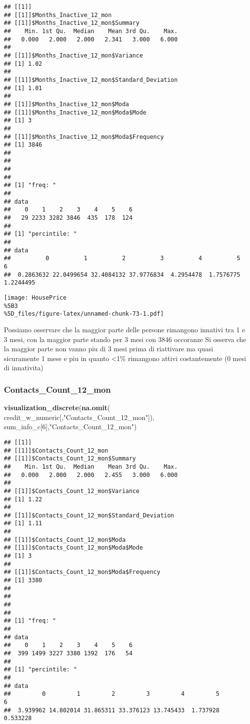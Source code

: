 \documentclass[
]{article}
\newenvironment{Shaded}{\begin{snugshade}}{\end{snugshade}}
\newcommand{\DecValTok}[1]{\textcolor[rgb]{0.00,0.00,0.81}{#1}}
\newcommand{\FunctionTok}[1]{\textcolor[rgb]{0.13,0.29,0.53}{\textbf{#1}}}
\newcommand{\NormalTok}[1]{#1}
\newcommand{\StringTok}[1]{\textcolor[rgb]{0.31,0.60,0.02}{#1}}
\begin{document}
\begin{verbatim}
## [[1]]
## [[1]]$Months_Inactive_12_mon
## [[1]]$Months_Inactive_12_mon$Summary
##    Min. 1st Qu.  Median    Mean 3rd Qu.    Max. 
##   0.000   2.000   2.000   2.341   3.000   6.000 
## 
## [[1]]$Months_Inactive_12_mon$Variance
## [1] 1.02
## 
## [[1]]$Months_Inactive_12_mon$Standard_Deviation
## [1] 1.01
## 
## [[1]]$Months_Inactive_12_mon$Moda
## [[1]]$Months_Inactive_12_mon$Moda$Mode
## [1] 3
## 
## [[1]]$Months_Inactive_12_mon$Moda$Frequency
## [1] 3846
## 
## 
## 
## 
## [1] "freq: "
## 
## data
##    0    1    2    3    4    5    6 
##   29 2233 3282 3846  435  178  124 
## 
## [1] "percintile: "
## 
## data
##          0          1          2          3          4          5          6 
##  0.2863632 22.0499654 32.4084132 37.9776834  4.2954478  1.7576775  1.2244495
\end{verbatim}

\texttt{[image: HousePrice\\\%5B3\\\%5D\_files/figure-latex/unnamed-chunk-73-1.pdf]}

Possiamo osservare che la maggior parte delle persone rimangono innativi
tra 1 e 3 mesi, con la maggior parte stando per 3 mesi con 3846
occoranze Si osserva che la maggior parte non vanno piu di 3 mesi prima
di riattivare ma quasi sicuramente 1 mese e piu in quanto \textless1\%
rimangono attivi costantemente (0 mesi di innativita)

\subsubsection{Contacts\_Count\_12\_mon}\label{contacts_count_12_mon}

\begin{Shaded}
\begin{Highlighting}[]
\FunctionTok{visualization\_discrete}\NormalTok{(}\FunctionTok{na.omit}\NormalTok{(}
\NormalTok{  credit\_w\_numeric[,}\StringTok{"Contacts\_Count\_12\_mon"}\NormalTok{]), sum\_info\_c[}\DecValTok{6}\NormalTok{],}\StringTok{"Contacts\_Count\_12\_mon"}\NormalTok{)}
\end{Highlighting}
\end{Shaded}

\begin{verbatim}
## [[1]]
## [[1]]$Contacts_Count_12_mon
## [[1]]$Contacts_Count_12_mon$Summary
##    Min. 1st Qu.  Median    Mean 3rd Qu.    Max. 
##   0.000   2.000   2.000   2.455   3.000   6.000 
## 
## [[1]]$Contacts_Count_12_mon$Variance
## [1] 1.22
## 
## [[1]]$Contacts_Count_12_mon$Standard_Deviation
## [1] 1.11
## 
## [[1]]$Contacts_Count_12_mon$Moda
## [[1]]$Contacts_Count_12_mon$Moda$Mode
## [1] 3
## 
## [[1]]$Contacts_Count_12_mon$Moda$Frequency
## [1] 3380
## 
## 
## 
## 
## [1] "freq: "
## 
## data
##    0    1    2    3    4    5    6 
##  399 1499 3227 3380 1392  176   54 
## 
## [1] "percintile: "
## 
## data
##         0         1         2         3         4         5         6 
##  3.939962 14.802014 31.865311 33.376123 13.745433  1.737928  0.533228
\end{verbatim}
\end{document}
